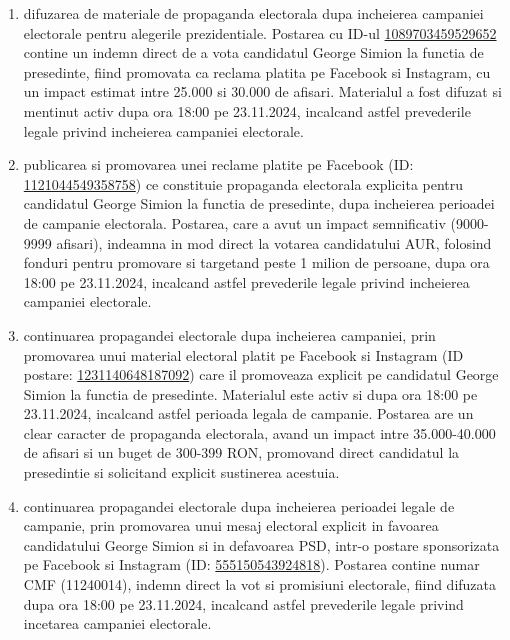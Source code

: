 \documentclass[a4paper,12pt]{article}
\begin{document}
\begin{enumerate}[leftmargin=*, label=\arabic*.)]
    \item difuzarea de materiale de propaganda electorala dupa incheierea campaniei electorale pentru alegerile prezidentiale. Postarea cu ID-ul \href{https://www.facebook.com/ads/library/?id=1089703459529652}{1089703459529652} contine un indemn direct de a vota candidatul George Simion la functia de presedinte, fiind promovata ca reclama platita pe Facebook si Instagram, cu un impact estimat intre 25.000 si 30.000 de afisari. Materialul a fost difuzat si mentinut activ dupa ora 18:00 pe 23.11.2024, incalcand astfel prevederile legale privind incheierea campaniei electorale.
    \item publicarea si promovarea unei reclame platite pe Facebook (ID: \href{https://www.facebook.com/ads/library/?id=1121044549358758}{1121044549358758}) ce constituie propaganda electorala explicita pentru candidatul George Simion la functia de presedinte, dupa incheierea perioadei de campanie electorala. Postarea, care a avut un impact semnificativ (9000-9999 afisari), indeamna in mod direct la votarea candidatului AUR, folosind fonduri pentru promovare si targetand peste 1 milion de persoane, dupa ora 18:00 pe 23.11.2024, incalcand astfel prevederile legale privind incheierea campaniei electorale.
    \item continuarea propagandei electorale dupa incheierea campaniei, prin promovarea unui material electoral platit pe Facebook si Instagram (ID postare: \href{https://www.facebook.com/ads/library/?id=1231140648187092}{1231140648187092}) care il promoveaza explicit pe candidatul George Simion la functia de presedinte. Materialul este activ si dupa ora 18:00 pe 23.11.2024, incalcand astfel perioada legala de campanie. Postarea are un clear caracter de propaganda electorala, avand un impact intre 35.000-40.000 de afisari si un buget de 300-399 RON, promovand direct candidatul la presedintie si solicitand explicit sustinerea acestuia.
    \item continuarea propagandei electorale dupa incheierea perioadei legale de campanie, prin promovarea unui mesaj electoral explicit in favoarea candidatului George Simion si in defavoarea PSD, intr-o postare sponsorizata pe Facebook si Instagram (ID: \href{https://www.facebook.com/ads/library/?id=555150543924818}{555150543924818}). Postarea contine numar CMF (11240014), indemn direct la vot si promisiuni electorale, fiind difuzata dupa ora 18:00 pe 23.11.2024, incalcand astfel prevederile legale privind incetarea campaniei electorale.

\end{enumerate}
\end{document}
